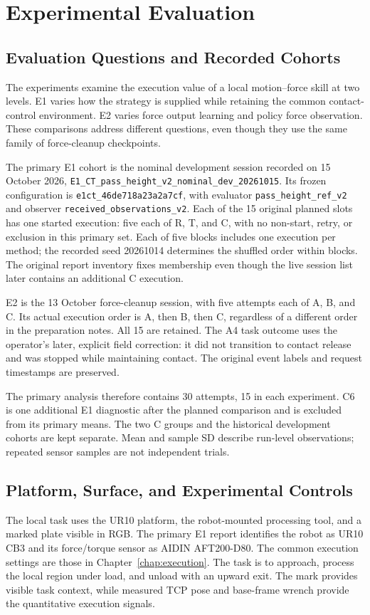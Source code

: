 \chapter{Experimental Evaluation}
\label{chap:experiments}

\section{Evaluation Questions and Recorded Cohorts}
The experiments examine the execution value of a local motion--force skill at two levels. E1 varies how the strategy is supplied while retaining the common contact-control environment. E2 varies force output learning and policy force observation. These comparisons address different questions, even though they use the same family of force-cleanup checkpoints.

The primary E1 cohort is the nominal development session recorded on 15 October 2026, \texttt{E1\_CT\_pass\_height\_v2\_nominal\_dev\_20261015}. Its frozen configuration is \texttt{e1ct\_46de718a23a2a7cf}, with evaluator \texttt{pass\_height\_ref\_v2} and observer \texttt{received\_observations\_v2}. Each of the 15 original planned slots has one started execution: five each of R, T, and C, with no non-start, retry, or exclusion in this primary set. Each of five blocks includes one execution per method; the recorded seed 20261014 determines the shuffled order within blocks. The original report inventory fixes membership even though the live session list later contains an additional C execution.

E2 is the 13 October force-cleanup session, with five attempts each of A, B, and C. Its actual execution order is A, then B, then C, regardless of a different order in the preparation notes. All 15 are retained. The A4 task outcome uses the operator's later, explicit field correction: it did not transition to contact release and was stopped while maintaining contact. The original event labels and request timestamps are preserved.

The primary analysis therefore contains 30 attempts, 15 in each experiment. C6 is one additional E1 diagnostic after the planned comparison and is excluded from its primary means. The two C groups and the historical development cohorts are kept separate. Mean and sample SD describe run-level observations; repeated sensor samples are not independent trials.

\section{Platform, Surface, and Experimental Controls}
The local task uses the UR10 platform, the robot-mounted processing tool, and a marked plate visible in RGB. The primary E1 report identifies the robot as UR10 CB3 and its force/torque sensor as AIDIN AFT200-D80. The common execution settings are those in Chapter~\ref{chap:execution}. The task is to approach, process the local region under load, and unload with an upward exit. The mark provides visible task context, while measured TCP pose and base-frame wrench provide the quantitative execution signals.

